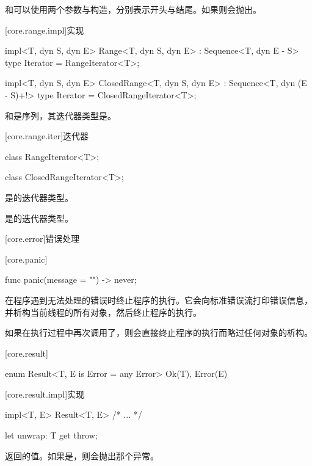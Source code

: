\pnum
{}和可以使用两个参数与构造，分别表示开头与结尾。如果则会抛出。

[core.range.impl]{实现}

\begin{itemdecl}
impl<T, dyn S, dyn E> Range<T, dyn S, dyn E> : Sequence<T, dyn E - S> {
    type Iterator = RangeIterator<T>;
}
\end{itemdecl}

\begin{itemdecl}
impl<T, dyn S, dyn E> ClosedRange<T, dyn S, dyn E> : Sequence<T, dyn (E - S)+!> {
    type Iterator = ClosedRangeIterator<T>;
}
\end{itemdecl}

\pnum
{}和是序列，其迭代器类型是。

[core.range.iter]{迭代器}

\begin{itemdecl}
class RangeIterator<T>;
\end{itemdecl}

\begin{itemdecl}
class ClosedRangeIterator<T>;
\end{itemdecl}

\pnum
{}是的迭代器类型。

\pnum
{}是的迭代器类型。

[core.error]{错误处理}

[core.panic]{}

\begin{itemdecl}
func panic(message = "") -> never;
\end{itemdecl}

\pnum
{}在程序遇到无法处理的错误时终止程序的执行。它会向标准错误流打印错误信息，并析构当前线程的所有对象，然后终止程序的执行。

\pnum
如果在执行过程中再次调用了，则会直接终止程序的执行而略过任何对象的析构。

[core.result]{}

\begin{itemdecl}
enum Result<T, E is Error = any Error> {
    Ok(T),
    Error(E)
}
\end{itemdecl}

[core.result.impl]{实现}

\begin{itemdecl}
impl<T, E> Result<T, E> { /* ... */ }
\end{itemdecl}

\begin{itemdecl}
let unwrap: T { get throw; }
\end{itemdecl}

\pnum
{}返回的值。如果是，则会抛出那个异常。